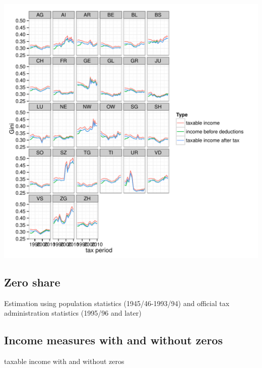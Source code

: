 \documentclass[twoside]{article}\usepackage[]{graphicx}\usepackage[]{color}
\makeatletter
\def\maxwidth{ %
  \ifdim\Gin@nat@width>\linewidth
    \linewidth
  \else
    \Gin@nat@width
  \fi
}
\newenvironment{knitrout}{}{} %
\makeatother
\begin{document}
\begin{multicols}{2}
\begin{knitrout}
\includegraphics[width=\maxwidth]{figure/different_ginis2} 

\end{knitrout}


\subsection{Zero share}

Estimation using population statistics (1945/46-1993/94) and official tax administration statistics (1995/96 and later) 


\subsection{Income measures with and without zeros}

taxable income with and without zeros


\end{multicols}
\end{document}
